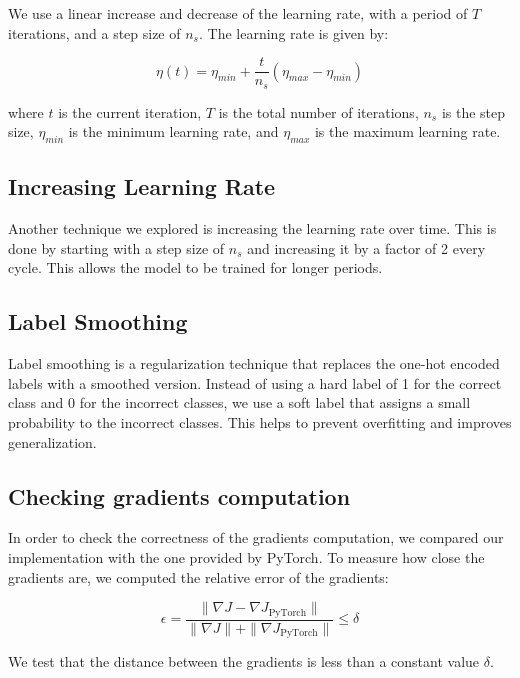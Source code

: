 \documentclass{article}
\begin{document}
We use a linear increase and decrease of the learning rate, with a period of $T$ iterations, and a step size of $n_s$. The learning rate is given by:

\begin{equation}
    \eta(t) = \eta_{min} + \frac{t}{n_s} (\eta_{max} - \eta_{min})
\end{equation}

where $t$ is the current iteration, $T$ is the total number of iterations, $n_s$ is the step size, $\eta_{min}$ is the minimum learning rate, and $\eta_{max}$ is the maximum learning rate.


\subsection{Increasing Learning Rate} 

Another technique we explored is increasing the learning rate over time. This is done by starting with a step size of $n_s$ and increasing it by a factor of 2 every cycle. This allows the model to be trained for longer periods.

\subsection{Label Smoothing}

Label smoothing is a regularization technique that replaces the one-hot encoded labels with a smoothed version. Instead of using a hard label of 1 for the correct class and 0 for the incorrect classes, we use a soft label that assigns a small probability to the incorrect classes. This helps to prevent overfitting and improves generalization.

\subsection{Checking gradients computation}

In order to check the correctness of the gradients computation, we compared our implementation with the one provided by PyTorch. To measure how close the gradients are, we computed the relative error of the gradients:

\begin{equation}
    \epsilon = \frac{\| \nabla J - \nabla J_{\text{PyTorch}} \|}{\| \nabla J \| + \| \nabla J_{\text{PyTorch}} \|} \leq \delta
\end{equation}

We test that the distance between the gradients is less than a constant value $\delta$.
\end{document}
